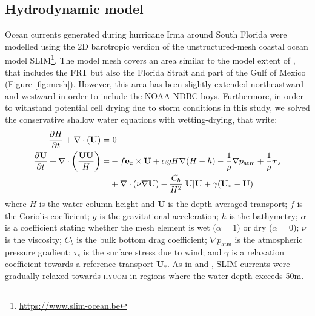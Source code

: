 \documentclass[11pt,a4paper]{article}
\newcommand{\hycom}{\textsc{hycom} }
\newcommand{\UV}{\mathbf{U}}
\begin{document}
\subsection{Hydrodynamic model}
Ocean currents generated during hurricane Irma around South Florida were modelled using the 2D barotropic verdion of the unstructured-mesh coastal ocean model SLIM\footnote{\url{https://www.slim-ocean.be}}. The model mesh covers an area similar to the model extent of \cite{dobbelaere2020coupled}, that includes the FRT but also the Florida Strait and part of the Gulf of Mexico (Figure \ref{fig:mesh}). However, this area has been slightly extended northeastward and westward in order to include the NOAA-NDBC boys. Furthermore, in order to withstand potential cell drying due to storm conditions in this study, we solved the conservative shallow water equations with wetting-drying, that write:
\begin{equation}
    \begin{split}
        \dfrac{\partial H}{\partial t} +\nabla\cdot(\UV) =& ~0 \\
        \dfrac{\partial \UV}{\partial t}  + \nabla\cdot\left(\dfrac{\UV\UV}{H}\right) =& -f\mathbf{e}_z \times \UV + \alpha gH\nabla(H-h) - \dfrac{1}{\rho}\nabla p_\text{atm} + \dfrac{1}{\rho}\text{\boldmath$\tau$}_s \\
         &+\nabla\cdot(\nu\nabla\UV) - \dfrac{C_b}{H^2}|\UV|\UV + \gamma(\UV_\ast-\UV)
    \end{split} \label{eq:slim}
\end{equation}
where $H$ is the water column height and $\UV$ is the depth-averaged transport; $f$ is the Coriolis coefficient; $g$ is the gravitational acceleration; $h$ is the bathymetry; $\alpha$ is a coefficient stating whether the mesh element is wet ($\alpha=1$) or dry ($\alpha=0$); $\nu$  is the viscosity; $C_b$ is the bulk bottom drag coefficient; $\nabla p_\text{atm}$ is the atmospheric pressure gradient; {\boldmath$\tau$}$_s$ is the surface stress due to wind; and $\gamma$ is a relaxation coefficient towards a reference transport $\UV_\ast$. As in \cite{frys2020fine} and \cite{dobbelaere2020coupled}, SLIM currents were gradually relaxed towards \hycom \citep{chassignet2007hycom} in regions where the water depth exceeds 50m.
\end{document}
